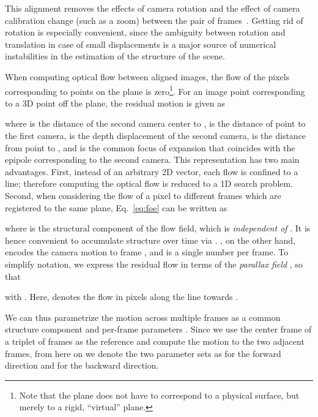 \documentclass[10pt,twocolumn,letterpaper]{article}
\begin{document}
This alignment removes the effects of camera rotation and the effect of camera calibration change (such as a zoom) between the pair of frames~\cite{Zelnik-Manor:2000:PlanarMotion}.
Getting rid of rotation is especially convenient, since the ambiguity between rotation and translation in case of small displacements is a major source of numerical instabilities in the estimation of the structure of the scene.

When computing optical flow between aligned images, the flow of the pixels corresponding to points on the plane is zero\footnote{Note that the plane does not have to correspond to a physical surface, but merely to a rigid, ``virtual'' plane.}.
For an image point  corresponding to a 3D point  off the plane, the residual motion is given as~\cite{Sawhney:1994:3DGeometryPPP}

where  is the distance of the second camera center to ,  is the distance of point  to the first camera,  is the depth displacement of the second camera,  is the distance from point  to , and  is the common focus of expansion that coincides with the epipole corresponding to the second camera.
This representation has two main advantages.
First, instead of an arbitrary 2D vector, each flow is confined to a line; therefore computing the optical flow is reduced to a 1D search problem.
Second, when considering the flow of a pixel to different frames  which are registered to the same plane,
Eq.~\eqref{eq:foe} can be written as

where  is the structural component of the flow field, which is \textit{independent of }.
It is hence convenient to accumulate structure over time via .
, on the other hand, encodes the camera motion to frame , and is a single number per frame.
To simplify notation, we express the residual flow in terms of the \textit{parallax field} , so that

with . Here,  denotes the flow in pixels along the line towards .

We can thus parametrize the motion across multiple frames as a common structure component  and per-frame parameters .
Since we use the center frame of a triplet of frames as the reference and compute the motion to the two adjacent frames, from here on we denote the two parameter sets as  for the forward direction and  for the backward direction.

%
\end{document}
